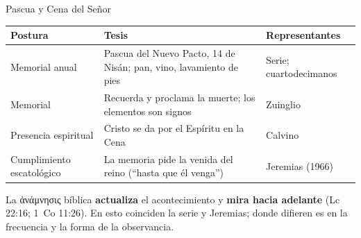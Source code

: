 \documentclass[hyperref={bookmarks=false},aspectratio=169]{beamer}
\newcommand{\grc}[1]{\foreignlanguage{ancientgreek}{#1}}
\newcommand{\destacar}[1]{\textbf{\textcolor{tierraroja}{#1}}}
\begin{document}
\begin{frame}{Pascua y Cena del Señor}
\scriptsize\renewcommand{\arraystretch}{1.12}
\begin{tabular}{@{}L{3.0cm}L{6.2cm}L{2.9cm}@{}}
\toprule
\textbf{Postura} & \textbf{Tesis} & \textbf{Representantes} \\ \midrule
Memorial anual & Pascua del Nuevo Pacto, 14 de Nisán; pan, vino, lavamiento de pies & Serie; cuartodecimanos \\
Memorial & Recuerda y proclama la muerte; los elementos son signos & Zuinglio \\
Presencia espiritual & Cristo se da por el Espíritu en la Cena & Calvino \\
Cumplimiento escatológico & La memoria pide la venida del reino (``hasta que él venga'') & Jeremias (1966) \\
\bottomrule
\end{tabular}\par\medskip
\small\RaggedRight La \grc{ἀνάμνησις} bíblica \destacar{actualiza} el acontecimiento y \destacar{mira hacia adelante} (Lc 22:16; 1~Co 11:26). En esto coinciden la serie y Jeremias; donde difieren es en la frecuencia y la forma de la observancia.
\end{frame}
\end{document}
